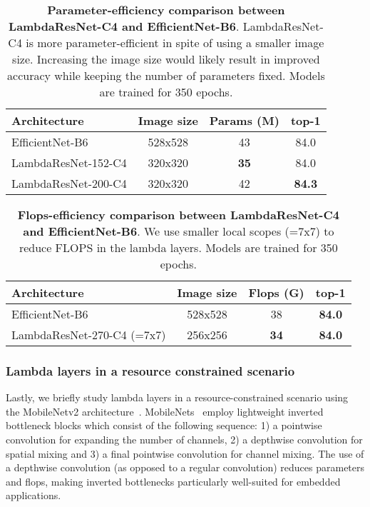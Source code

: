 \documentclass{article} \usepackage{iclr2021_conference,times}
\begin{document}
\begin{table}[h!]
    \begin{center}
    \small
    \begin{tabular}{lccc}
    \toprule
    Architecture & Image size & Params (M) & top-1 \\
    \midrule
    EfficientNet-B6 & 528x528 & 43 & 84.0 \\
    LambdaResNet-152-C4 & 320x320 & \textbf{35} & 84.0 \\
    LambdaResNet-200-C4 & 320x320 & 42 & \textbf{84.3} \\
    \bottomrule
    \end{tabular}
    \caption{
    \textbf{Parameter-efficiency comparison between LambdaResNet-C4 and EfficientNet-B6}.
    LambdaResNet-C4 is more parameter-efficient in spite of using a smaller image size.
    Increasing the image size would likely result in improved accuracy while keeping the number of parameters fixed. Models are trained for 350 epochs.}
    \label{tab:parameter_efficient}
    \end{center}
\end{table}

\begin{table}[h!]
    \begin{center}
    \small
    \begin{tabular}{lccc}
    \toprule
    Architecture & Image size & Flops (G) & top-1 \\
    \midrule
    EfficientNet-B6 & 528x528 & 38 & \textbf{84.0} \\
    LambdaResNet-270-C4 (=7x7) & 256x256 & \textbf{34} & \textbf{84.0} \\
    \bottomrule
    \end{tabular}
    \caption{
    \textbf{Flops-efficiency comparison between LambdaResNet-C4 and EfficientNet-B6}.
    We use smaller local scopes (=7x7) to reduce FLOPS in the lambda layers. Models are trained for 350 epochs.}
    \label{tab:flops_efficient}
    \end{center}
\end{table}

\subsubsection{Lambda layers in a resource constrained scenario \label{sec:mobilenets}}
Lastly, we briefly study lambda layers in a resource-constrained scenario using the MobileNetv2 architecture~\citep{sandler2018mobilenetv2}.
MobileNets~\citep{howard2017mobilenets,sandler2018mobilenetv2,howard2019searching} employ lightweight inverted bottleneck blocks which consist of the following sequence: 1) a pointwise convolution for expanding the number of channels, 2) a depthwise convolution for spatial mixing and 3) a final pointwise convolution for channel mixing.
The use of a depthwise convolution (as opposed to a regular convolution) reduces parameters and flops, making inverted bottlenecks particularly well-suited for embedded applications.
\end{document}
